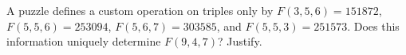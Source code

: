 A puzzle defines a custom operation on triples only by $F(3,5,6)=151872$, $F(5,5,6)=253094$, $F(5,6,7)=303585$, and $F(5,5,3)=251573$. Does this information uniquely determine $F(9,4,7)$? Justify.
